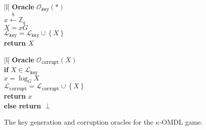 \documentclass[11pt]{article}
\theoremstyle{definition}
\newcommand{\Zq}{\mathbb{Z}_q}
\newcommand{\corruptionOracle}{\mathcal{O}_{\texttt{corrupt}}}
\newcommand{\keyOracle}{\mathcal{O}_{\texttt{key}}}
\newcommand{\challengeKeySet}{\mathcal{L}_{\texttt{key}}}
\newcommand{\corruptedKeySet}{\mathcal{L}_{\texttt{corrupt}}}
\newcommand{\free}[1]{{\textcolor{Red}{#1}}}
\newcommand{\lar}{\leftarrow}
\newcommand{\lsamp}{\xleftarrow{\$}}
\begin{document}
\begin{oracle}
    \centering
    \begin{suboracle}[ht]{0.2\textwidth}
        \begin{tabular}{|l|}
        \hline
          {\textbf{Oracle} $\keyOracle(\ast)$} \\
        \hline 
        $x \lsamp \Zq$ \\
        $X=xG$ \\
        $\challengeKeySet = \challengeKeySet \cup \left\{X\right\}$ \\
        \textbf{return } $X$ \\
        \hline
        \end{tabular}
    \end{suboracle}
    \hspace{1em}
    \begin{suboracle}[ht]{0.3\textwidth}
        \begin{tabular}{|l|}
        \hline
          {\textbf{Oracle} $\corruptionOracle(X)$} \\
        \hline 
        \textbf{if} $X \in \challengeKeySet$ \\ \quad \quad
        $x=\log_G{X}$ \\ \quad \quad 
        $\corruptedKeySet = \corruptedKeySet \cup \left\{X\right\}$ \\ \quad \quad
        \textbf{return} $x$ \\
        \textbf{else return} $\perp$ \\
        

        \hline
        \end{tabular}
    \end{suboracle}
\caption{The key generation and corruption oracles for the $\kappa$-OMDL game.}
\label{oracle:OMDL}
\end{oracle}
\end{document}
